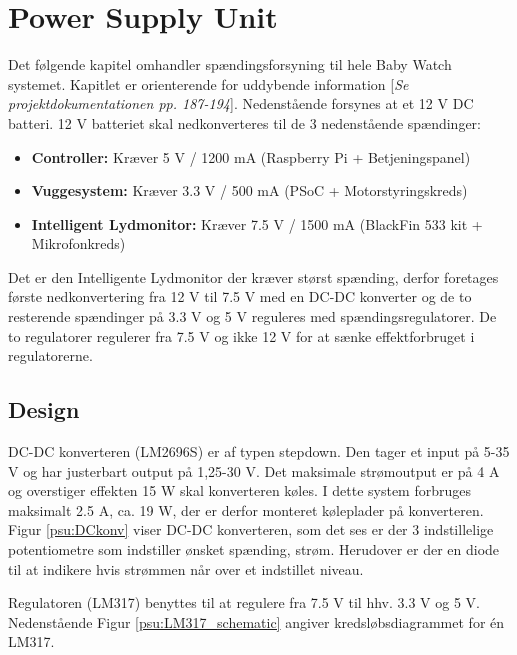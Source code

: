 \chapter{Power Supply Unit}

Det følgende kapitel omhandler spændingsforsyning til hele Baby Watch systemet. Kapitlet er orienterende for uddybende information [\textit{Se projektdokumentationen pp. 187-194}]. Nedenstående forsynes at et 12 V DC batteri. 12 V batteriet skal nedkonverteres til de 3 nedenstående spændinger: 
\begin{itemize}
\item \textbf{Controller:} Kræver 5 V / 1200 mA (Raspberry Pi + Betjeningspanel)

\item \textbf{Vuggesystem:} Kræver 3.3 V / 500 mA (PSoC + Motorstyringskreds)

\item \textbf{Intelligent Lydmonitor:} Kræver 7.5 V / 1500 mA (BlackFin 533 kit + Mikrofonkreds)
\end{itemize}

Det er den Intelligente Lydmonitor der kræver størst spænding, derfor foretages første nedkonvertering fra 12 V til 7.5 V med en DC-DC konverter og de to resterende spændinger på 3.3 V og 5 V reguleres med spændingsregulatorer. De to regulatorer regulerer fra 7.5 V og ikke 12 V for at sænke effektforbruget i regulatorerne. 

\section{Design}

DC-DC konverteren (LM2696S) er af typen stepdown. Den tager et input på 5-35 V og har justerbart output på 1,25-30 V. Det maksimale strømoutput er på 4 A og overstiger effekten 15 W skal konverteren køles. I dette system forbruges maksimalt 2.5 A, ca. 19 W, der er derfor monteret køleplader på konverteren. Figur \ref{psu:DCkonv} viser DC-DC konverteren, som det ses er der 3 indstillelige potentiometre som indstiller ønsket spænding, strøm. Herudover er der en diode til at indikere hvis strømmen når over et indstillet niveau.  


\newpage

Regulatoren (LM317) benyttes til at regulere fra 7.5 V til hhv. 3.3 V og 5 V. Nedenstående Figur \ref{psu:LM317_schematic} angiver kredsløbsdiagrammet for én LM317.


